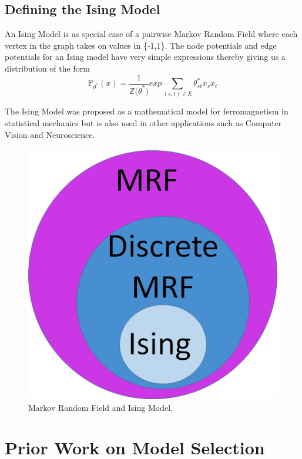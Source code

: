 \documentclass[11pt]{article}
\begin{document}
\subsection{Defining the Ising Model}
An Ising Model is as special case of a pairwise Markov Random Field where each vertex in the graph takes on values in \{-1,1\}.
The node potentials and edge potentials for an Ising model have very simple expressions thereby giving us a distribution of the form
\[ \mathbb{P}_{\theta^*} (x)  =  \frac{1}{\mathbb{Z(\theta}^*)} exp { \sum\limits_{ (s,t) \in E} \theta^*_{st} x_s x_t  }   \]

The Ising Model was proposed as a mathematical model for ferromagnetism in statistical mechanics but is also used in other applications such as Computer Vision and Neuroscience.

\begin{figure}[h!]
\includegraphics[scale=0.5]{MRF}
\centering
\caption{Markov Random Field and Ising Model.}
\end{figure}


\section{Prior Work on Model Selection}
\end{document}
